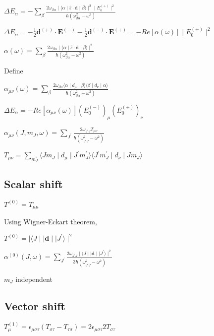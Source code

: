 \documentclass{article}
\begin{document}
$\Delta E_{\alpha} = -\sum_{\beta} \frac{2 \omega_{\beta \alpha} \mid \langle \alpha \mid \hat{\varepsilon} \cdot \textbf{d} \mid \beta \rangle \mid^2 \mid E_0^{(+)} \mid^2}{\hbar (\omega_{\beta \alpha}^2 - \omega^2)}$

$\Delta E_{\alpha} = -\frac{1}{2} \textbf{d}^{(+)} \cdot \textbf{E}^{(-)} - \frac{1}{2} \textbf{d}^{(-)} \cdot \textbf{E}^{(+)} = - Re[\alpha(\omega)] \mid E_0^{(+)} \mid^2$

$\alpha(\omega) = \sum_{\beta} \frac{2 \omega_{\beta \alpha} \mid \langle \alpha \mid \hat{\varepsilon} \cdot \textbf{d} \mid \beta \rangle \mid^2}{\hbar (\omega_{\beta \alpha}^2 - \omega^2)}$

    Define

$\alpha_{\mu \nu}(\omega) = \sum_{\beta} \frac{2 \omega_{\beta \alpha}  \langle \alpha \mid d_{\mu} \mid \beta \rangle \langle \beta \mid d_{\nu} \mid \alpha \rangle }{\hbar (\omega_{\beta \alpha}^2 - \omega^2)}$

$\Delta E_{\alpha} = - Re[\alpha_{\mu \nu}(\omega)]  (E_0^{(-)})_{\mu} (E_0^{(+)})_{\nu} $

$\alpha_{\mu \nu}(J, m_J, \omega) = \sum_{J^{'}} \frac{2 \omega_{J^{'} J}  T_{\mu \nu} }{\hbar (\omega_{J^{'} J}^2 - \omega^2)}$

$ T_{\mu \nu} = \sum_{m_J^{'}}\langle J m_J \mid d_{\mu} \mid J^{'} m_J^{'}\rangle \langle J^{'} m_J^{'} \mid d_{\nu} \mid J m_J \rangle$


    \subsection{Scalar shift}\label{scalar-shift}

    $T^{(0)} = T_{\mu \mu}$

Using Wigner-Eckart theorem,

$T^{(0)} = \mid \langle J \mid\mid \textbf{d} \mid \mid J^{'} \rangle \mid^2$

$\alpha^{(0)}(J, \omega) = \sum_{J^{'}} \frac{2 \omega_{J^{'} J} \mid \langle J \mid\mid \textbf{d} \mid \mid J^{'} \rangle \mid^2}{3 \hbar (\omega_{J^{'} J}^2 - \omega^2)}$

$m_J$ independent

    \subsection{Vector shift}\label{vector-shift}

    $T_{\mu}^{(1)} = \epsilon_{\mu \sigma \tau} (T_{\sigma \tau} - T_{\tau \sigma}) = 2 \epsilon_{\mu \sigma \tau} 2 T_{\sigma \tau}$
\end{document}

